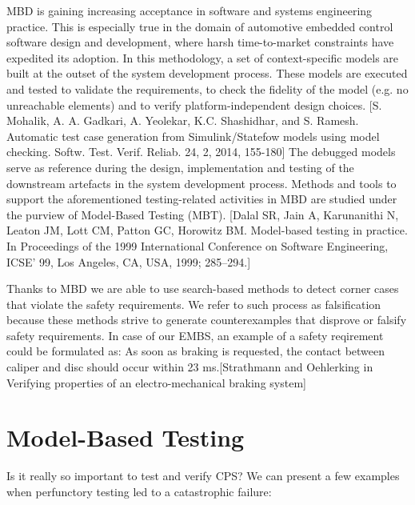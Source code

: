 MBD is gaining increasing acceptance in software and systems engineering practice. This is especially true in the domain of automotive embedded control software design and development, where harsh time-to-market constraints have expedited its adoption. In this methodology, a set of context-specific models are built at the outset of the system development process. These models are executed and tested to validate the requirements, to check the fidelity of the model (e.g. no unreachable elements) and to verify platform-independent design choices. [S. Mohalik, A. A. Gadkari, A. Yeolekar, K.C. Shashidhar, and S. Ramesh. Automatic test case generation from Simulink/Statefow models using model checking. Softw. Test. Verif. Reliab. 24, 2, 2014, 155-180] The debugged models serve as reference during the design, implementation and testing of the downstream artefacts in the system development process. Methods and tools to support the aforementioned testing-related activities in MBD are studied under the purview of Model-Based Testing (MBT). [Dalal SR, Jain A, Karunanithi N, Leaton JM, Lott CM, Patton GC, Horowitz BM. Model-based testing in practice. In Proceedings of the 1999 International Conference on Software Engineering, ICSE’ 99, Los Angeles, CA, USA, 1999; 285–294.]

Thanks to MBD we are able to use search-based methods to detect corner cases that violate the safety requirements. We refer to such process as falsification because these methods strive to generate counterexamples that disprove or falsify safety requirements. In case of our EMBS, an example of a safety reqirement could be formulated as: As soon as braking is requested, the contact between caliper and disc should occur within 23 ms.[Strathmann and Oehlerking in Verifying properties of an electro-mechanical braking system]

\section{Model-Based Testing}

Is it really so important to test and verify CPS? We can present a few examples when perfunctory testing led to a catastrophic failure:

